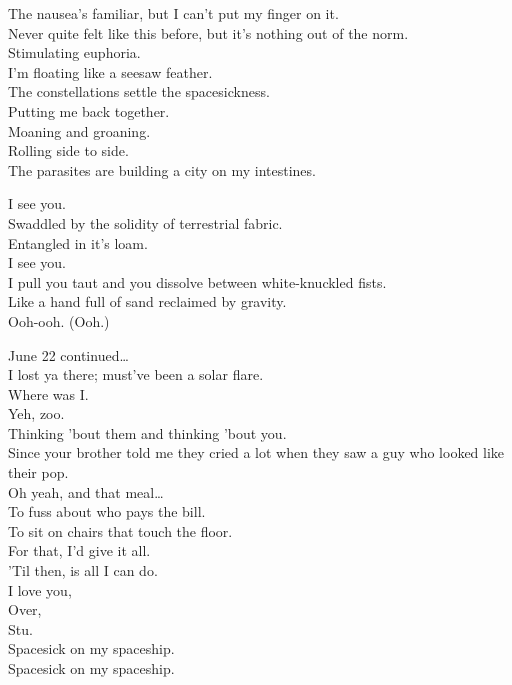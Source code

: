 The nausea's familiar, but I can't put my finger on it. \\
Never quite felt like this before, but it's nothing out of the norm. \\
Stimulating euphoria. \\
I'm floating like a seesaw feather. \\
The constellations settle the spacesickness. \\
Putting me back together. \\

Moaning and groaning. \\
Rolling side to side. \\
The parasites are building a city on my intestines. \\


I see you. \\
Swaddled by the solidity of terrestrial fabric. \\
Entangled in it's loam. \\
I see you. \\
I pull you taut and you dissolve between white-knuckled fists. \\
Like a hand full of sand reclaimed by gravity. \\
Ooh-ooh. (Ooh.) \\


June 22 continued… \\
I lost ya there; must've been a solar flare. \\
Where was I. \\
Yeh, zoo. \\
Thinking 'bout them and thinking 'bout you. \\
Since your brother told me they cried a lot when they saw a guy who looked like their pop. \\
Oh yeah, and that meal… \\
To fuss about who pays the bill. \\
To sit on chairs that touch the floor. \\
For that, I'd give it all. \\
'Til then,  is all I can do. \\
I love you, \\
Over, \\
Stu. \\

Spacesick on my spaceship. \\
Spacesick on my spaceship. \\

